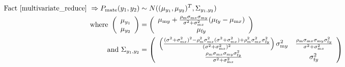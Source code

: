\documentclass{article}
\newcommand{\x}[1]{\text{#1}}
\begin{document}
\begin{align*}
\\ \text{Fact \ref{multivariate_reduce} } \Rightarrow P_\text{mate}(y_1,y_2)&\sim N((\mu_{y_1},\mu_{y_2})^T,\Sigma_{y_1,y_2})
\\ \text{ where } \left(\begin{array}{cc}\mu_{y_1} \\ \mu_{y_2} \end{array}\right)&=\left(\begin{array}{cc}\mu_{\x{m}y}+\frac{\rho_\x{m}\sigma_{\x{m}x}\sigma_{\x{m}y}}{\sigma^2+\sigma_{\x{m}x}^2}(\mu_{\x{f}y}-\mu_{\x{m}x}) \\ \mu_{\x{f}y}
 \end{array}\right)
 \\\text{ and } \Sigma_{y_1,y_2}&=\left(\begin{array}{cc}\left(\frac{(\sigma^2+\sigma_{\x{m}x}^2)^2-\rho_\x{m}^2\sigma_{\x{m}x}^2(\sigma^2+\sigma_{\x{m}x}^2)+\rho_\x{m}^2\sigma_{\x{m}x}^2\sigma_{\x{f}y}^2}{(\sigma^2+\sigma_{\x{m}x}^2)^2}\right)\sigma_{\x{m}y}^2 & \frac{\rho_\x{m}\sigma_{\x{m}x}\sigma_{\x{m}y}\sigma_{\x{f}y}^2}{\sigma^2+\sigma_{\x{m}x}^2}
 \\\frac{\rho_\x{m}\sigma_{\x{m}x}\sigma_{\x{m}y}\sigma_{\x{f}y}^2}{\sigma^2+\sigma_{\x{m}x}^2} & \sigma_{\x{f}y}^2 \end{array}\right)
\end{align*}
\end{document}

